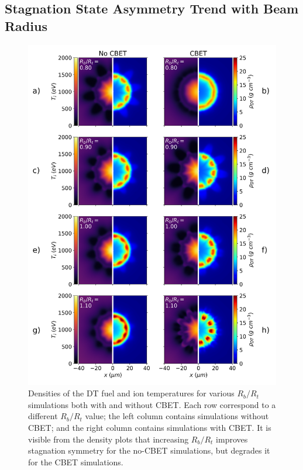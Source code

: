 \subsection{Stagnation State Asymmetry Trend with Beam Radius}%
\label{sec:Res1_stagnation_asymm_trend}

\begin{figure}[t!]
    \includegraphics[width=0.9\linewidth]{Results1/Images/Stagnation_plots.png}
    \centering
    \caption{Densities of the DT fuel and ion temperatures for various $R_b/R_t$ simulations both with and without \ac{CBET}.
    Each row correspond to a different $R_b/R_t$ value; the left column contains simulations without \ac{CBET}; and the right column contains simulations with \ac{CBET}.
    It is visible from the density plots that increasing $R_b/R_t$ improves stagnation symmetry for the no-\ac{CBET} simulations, but degrades it for the \ac{CBET} simulations.}%
    \label{fig:Res1_stagnation_plots}
\end{figure}

